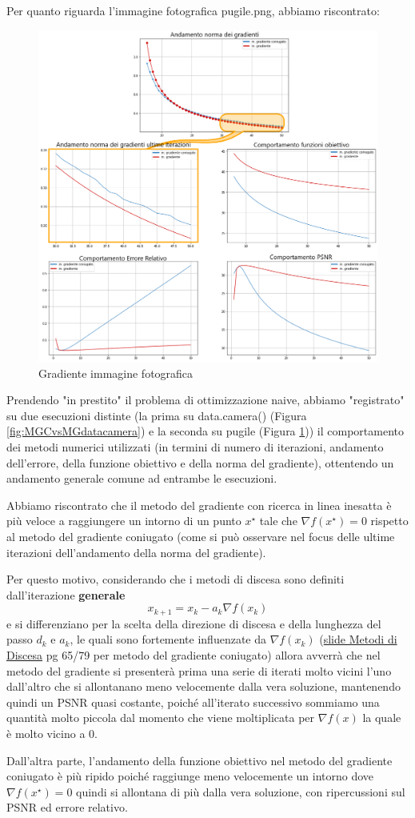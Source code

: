 Per quanto riguarda l'immagine fotografica pugile.png, abbiamo riscontrato: 

\begin{figure}[H]
    \centering
    \includegraphics[width=\textwidth]{output/MGCvsMG-pugile-enph.png}
    \caption{Gradiente immagine fotografica}
    \label{fig:MGCvsMG-pugile}
\end{figure}

Prendendo "in prestito" il problema di ottimizzazione naive,
abbiamo "registrato" su due esecuzioni distinte (la prima su data.camera() 
(Figura \ref{fig:MGCvsMGdatacamera}) e la seconda su pugile 
(Figura \ref{fig:MGCvsMG-pugile}))
il comportamento dei metodi numerici utilizzati (in termini di numero di iterazioni, andamento 
dell'errore, della funzione obiettivo e della norma del gradiente), ottentendo un andamento 
generale comune ad entrambe le esecuzioni.

Abbiamo riscontrato che il metodo del gradiente con ricerca in linea inesatta è più veloce a
 raggiungere un intorno di un punto $x^{\star}$ tale che $\nabla f(x^{\star})=0$ rispetto al metodo del gradiente coniugato
 (come si può osservare nel focus delle ultime iterazioni dell'andamento della norma del gradiente).
 
Per questo motivo, considerando 
che i metodi di discesa sono definiti dall’iterazione \textbf{generale}
 \[x_{k+1} = x_k - a_k \nabla f(x_k)\]
 e si differenziano per la scelta della direzione di discesa e della lunghezza del passo $d_k$ e $a_k$, 
 le quali sono fortemente influenzate da $\nabla f(x_k)$ (\href{https://virtuale.unibo.it/mod/resource/view.php?id=750335}{slide Metodi di Discesa} pg 65/79 per metodo del gradiente coniugato)
allora avverrà che nel metodo del gradiente si presenterà prima una serie di iterati molto
 vicini l'uno dall'altro che si allontanano meno velocemente dalla vera soluzione, mantenendo quindi un PSNR
 quasi costante, poiché all'iterato successivo sommiamo una quantità molto piccola dal momento
 che viene moltiplicata per $\nabla f(x)$ la quale è molto vicino a 0. 

Dall'altra parte, l'andamento della funzione obiettivo nel metodo del gradiente coniugato è 
più ripido poiché raggiunge meno velocemente un intorno dove $\nabla f(x^{\star}) = 0$ quindi si allontana di più
 dalla vera soluzione, con ripercussioni sul PSNR ed errore relativo.